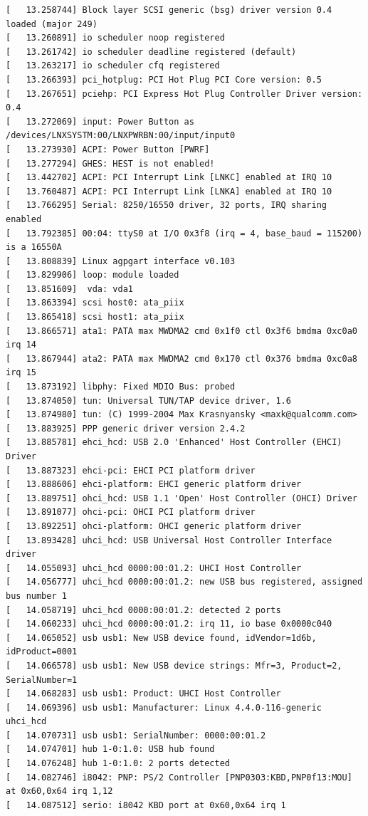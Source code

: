 \documentclass[12pt]{article}
\begin{document}
\begin{verbatim}
[   13.258744] Block layer SCSI generic (bsg) driver version 0.4 loaded (major 249)
[   13.260891] io scheduler noop registered
[   13.261742] io scheduler deadline registered (default)
[   13.263217] io scheduler cfq registered
[   13.266393] pci_hotplug: PCI Hot Plug PCI Core version: 0.5
[   13.267651] pciehp: PCI Express Hot Plug Controller Driver version: 0.4
[   13.272069] input: Power Button as /devices/LNXSYSTM:00/LNXPWRBN:00/input/input0
[   13.273930] ACPI: Power Button [PWRF]
[   13.277294] GHES: HEST is not enabled!
[   13.442702] ACPI: PCI Interrupt Link [LNKC] enabled at IRQ 10
[   13.760487] ACPI: PCI Interrupt Link [LNKA] enabled at IRQ 10
[   13.766295] Serial: 8250/16550 driver, 32 ports, IRQ sharing enabled
[   13.792385] 00:04: ttyS0 at I/O 0x3f8 (irq = 4, base_baud = 115200) is a 16550A
[   13.808839] Linux agpgart interface v0.103
[   13.829906] loop: module loaded
[   13.851609]  vda: vda1
[   13.863394] scsi host0: ata_piix
[   13.865418] scsi host1: ata_piix
[   13.866571] ata1: PATA max MWDMA2 cmd 0x1f0 ctl 0x3f6 bmdma 0xc0a0 irq 14
[   13.867944] ata2: PATA max MWDMA2 cmd 0x170 ctl 0x376 bmdma 0xc0a8 irq 15
[   13.873192] libphy: Fixed MDIO Bus: probed
[   13.874050] tun: Universal TUN/TAP device driver, 1.6
[   13.874980] tun: (C) 1999-2004 Max Krasnyansky <maxk@qualcomm.com>
[   13.883925] PPP generic driver version 2.4.2
[   13.885781] ehci_hcd: USB 2.0 'Enhanced' Host Controller (EHCI) Driver
[   13.887323] ehci-pci: EHCI PCI platform driver
[   13.888606] ehci-platform: EHCI generic platform driver
[   13.889751] ohci_hcd: USB 1.1 'Open' Host Controller (OHCI) Driver
[   13.891077] ohci-pci: OHCI PCI platform driver
[   13.892251] ohci-platform: OHCI generic platform driver
[   13.893428] uhci_hcd: USB Universal Host Controller Interface driver
[   14.055093] uhci_hcd 0000:00:01.2: UHCI Host Controller
[   14.056777] uhci_hcd 0000:00:01.2: new USB bus registered, assigned bus number 1
[   14.058719] uhci_hcd 0000:00:01.2: detected 2 ports
[   14.060233] uhci_hcd 0000:00:01.2: irq 11, io base 0x0000c040
[   14.065052] usb usb1: New USB device found, idVendor=1d6b, idProduct=0001
[   14.066578] usb usb1: New USB device strings: Mfr=3, Product=2, SerialNumber=1
[   14.068283] usb usb1: Product: UHCI Host Controller
[   14.069396] usb usb1: Manufacturer: Linux 4.4.0-116-generic uhci_hcd
[   14.070731] usb usb1: SerialNumber: 0000:00:01.2
[   14.074701] hub 1-0:1.0: USB hub found
[   14.076248] hub 1-0:1.0: 2 ports detected
[   14.082746] i8042: PNP: PS/2 Controller [PNP0303:KBD,PNP0f13:MOU] at 0x60,0x64 irq 1,12
[   14.087512] serio: i8042 KBD port at 0x60,0x64 irq 1

\end{verbatim}
\end{document}

